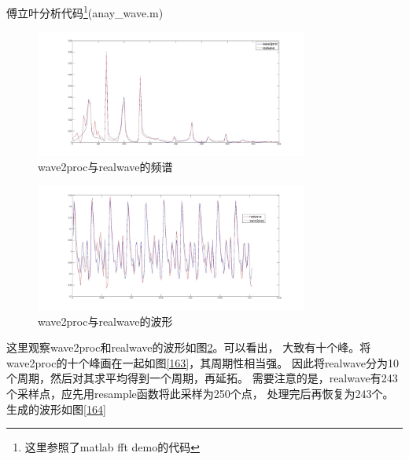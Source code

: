 \documentclass{ctexart}
\begin{document}
        傅立叶分析代码\footnote{这里参照了matlab fft demo的代码}(anay\_wave.m)
        
        \begin{figure}
            \centering
            \includegraphics[width=0.8\textwidth]{fmt/1_6_1.jpg}
            \caption{wave2proc与realwave的频谱\label{161}}
        \end{figure}
        \begin{figure}
            \includegraphics[width=0.8\textwidth]{fmt/1_6_2.jpg}
            \centering
            \caption{wave2proc与realwave的波形\label{162}}
        \end{figure}
        这里观察wave2proc和realwave的波形如图\ref{162}。可以看出，
        大致有十个峰。将wave2proc的十个峰画在一起如图\ref{163}，其周期性相当强。
        因此将realwave分为10个周期，然后对其求平均得到一个周期，再延拓。
        需要注意的是，realwave有243个采样点，应先用resample函数将此采样为250个点，
        处理完后再恢复为243个。生成的波形如图\ref{164}
\end{document}
